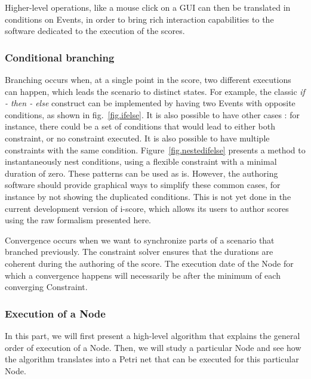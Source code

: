 \documentclass{article}
\begin{document}
	Higher-level operations, like a mouse click on a GUI can then be translated in conditions on Events, in order to bring rich interaction capabilities to the software dedicated to the execution of the scores.
	
	\subsubsection{Conditional branching}
	Branching occurs when, at a single point in the score, two different executions can happen, which leads the scenario to distinct states.
	For example, the classic \emph{if - then - else} construct can be implemented by having two Events with opposite conditions, as shown in fig.~\ref{fig.ifelse}.
	It is also possible to have other cases : for instance, there could be a set of conditions that would lead to either both constraint, or no constraint executed. It is also possible to have multiple constraints with the same condition.
	Figure~\ref{fig.nestedifelse} presents a method to instantaneously nest conditions, using a flexible constraint with a minimal duration of zero. 
	These patterns can be used as is. 
	However, the authoring software should provide graphical ways to simplify these common cases, for instance by not showing the duplicated conditions. This is not yet done in the current development version of i-score, which allows its users to author scores using the raw formalism presented here.
	
	Convergence occurs when we want to synchronize parts of a scenario that branched previously. The constraint solver ensures that the durations are coherent during the authoring of the score. The execution date of the Node for which a convergence happens will necessarily be after the minimum of each converging Constraint.
	
	\subsubsection{Execution of a Node}
	In this part, we will first present a high-level algorithm that explains the general order of execution of a Node. Then, we will study a particular Node and see how the algorithm translates into a Petri net that can be executed for this particular Node.
	
\end{document}

